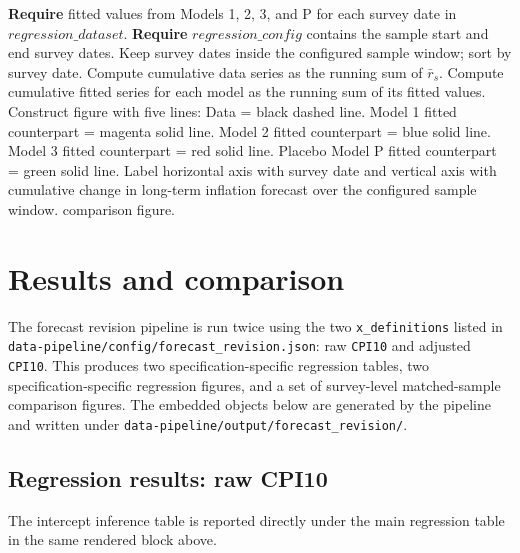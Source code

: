 \documentclass[11pt]{article}
\newcommand{\worktreerootrelative}{../..}
\newcommand{\forecastrevisionoutputroot}{\worktreerootrelative/data-pipeline/output/forecast_revision}
\begin{document}
\begin{algorithm}[H]
\caption{\textsc{PlotCumulativeForecastRevisionComparison}$(\textit{regression\_dataset}, \textit{fitted\_values}, \textit{regression\_config})$}
\begin{algorithmic}[1]
\State \textbf{Require} fitted values from Models 1, 2, 3, and P for each survey date in
\Statex \quad $\textit{regression\_dataset}$.
\State \textbf{Require} $\textit{regression\_config}$ contains the sample start and end survey dates.
\State Keep survey dates inside the configured sample window; sort by survey date.
\State Compute cumulative data series as the running sum of $\bar{r}_s$.
\State Compute cumulative fitted series for each model as the running sum of its fitted values.
\State Construct figure with five lines:
\Statex \quad Data = black dashed line.
\Statex \quad Model 1 fitted counterpart = magenta solid line.
\Statex \quad Model 2 fitted counterpart = blue solid line.
\Statex \quad Model 3 fitted counterpart = red solid line.
\Statex \quad Placebo Model P fitted counterpart = green solid line.
\State Label horizontal axis with survey date and vertical axis with cumulative change
\Statex \quad in long-term inflation forecast over the configured sample window.
\State \Return comparison figure.
\end{algorithmic}
\end{algorithm}

\section{Results and comparison}

The forecast revision pipeline is run twice using the two
\texttt{x\_definitions} listed in
\texttt{data-pipeline/config/forecast\_revision.json}: raw \texttt{CPI10} and
adjusted \texttt{CPI10}. This produces two specification-specific regression
tables, two specification-specific regression figures, and a set of
survey-level matched-sample comparison figures. The embedded objects below are
generated by the pipeline and written under
\texttt{data-pipeline/output/forecast\_revision/}.

\subsection{Regression results: raw CPI10}


The intercept inference table is reported directly under the main regression
table in the same rendered block above.
\end{document}
